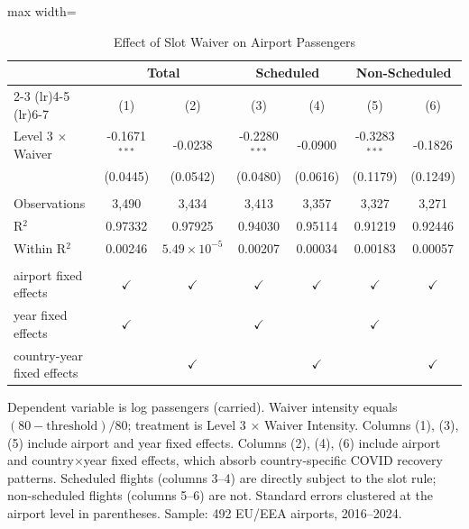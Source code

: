 
\begin{table}[htbp]
   \caption{\label{tab:main} Effect of Slot Waiver on Airport Passengers}
   \bigskip
   \centering
   \begin{adjustbox}{max width=\textwidth}
   \begin{tabular}{lcccccc}
      \toprule
       & \multicolumn{2}{c}{Total} & \multicolumn{2}{c}{Scheduled} & \multicolumn{2}{c}{Non-Scheduled}\\
      \cmidrule(lr){2-3} \cmidrule(lr){4-5} \cmidrule(lr){6-7}
                                 & (1)             & (2)                   & (3)             & (4)           & (5)             & (6)\\  
      \midrule 
      Level 3 $\times$ Waiver          & -0.1671$^{***}$ & -0.0238               & -0.2280$^{***}$ & -0.0900       & -0.3283$^{***}$ & -0.1826\\   
                                 & (0.0445)        & (0.0542)              & (0.0480)        & (0.0616)      & (0.1179)        & (0.1249)\\   
       \\
      Observations               & 3,490           & 3,434                 & 3,413           & 3,357         & 3,327           & 3,271\\  
      R$^2$                      & 0.97332         & 0.97925               & 0.94030         & 0.95114       & 0.91219         & 0.92446\\  
      Within R$^2$               & 0.00246         & $5.49\times 10^{-5}$  & 0.00207         & 0.00034       & 0.00183         & 0.00057\\  
       \\
      airport fixed effects      & $\checkmark$    & $\checkmark$          & $\checkmark$    & $\checkmark$  & $\checkmark$    & $\checkmark$\\   
      year fixed effects         & $\checkmark$    &                       & $\checkmark$    &               & $\checkmark$    & \\  
      country-year fixed effects &                 & $\checkmark$          &                 & $\checkmark$  &                 & $\checkmark$\\   
      \bottomrule
   \end{tabular}
   \end{adjustbox}

   \par \raggedright 
   Dependent variable is log passengers (carried). Waiver intensity equals $(80 - \text{threshold})/80$; treatment is Level 3 $\times$ Waiver Intensity. Columns (1), (3), (5) include airport and year fixed effects. Columns (2), (4), (6) include airport and country$\times$year fixed effects, which absorb country-specific COVID recovery patterns. Scheduled flights (columns 3--4) are directly subject to the slot rule; non-scheduled flights (columns 5--6) are not. Standard errors clustered at the airport level in parentheses. Sample: 492 EU/EEA airports, 2016--2024.
\end{table}


